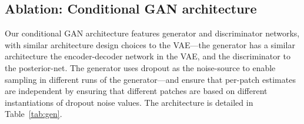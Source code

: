 \documentclass[10pt,twocolumn,letterpaper]{article}
\begin{document}
\subsection{Ablation: Conditional GAN architecture}

Our conditional GAN architecture features generator and discriminator networks, with similar architecture design choices to the VAE---the generator has a similar architecture the encoder-decoder network in the VAE, and the discriminator to the posterior-net. The generator uses dropout as the noise-source to enable sampling in different runs of the generator---and ensure that per-patch estimates are independent by ensuring that different patches are based on different instantiations of dropout noise values. The architecture is detailed in Table~\ref{tab:gen}.
\begin{table}[!t]
  \begin{center}
    \parbox[c]{0.47\textwidth}{}
\end{center}
\end{table}
\end{document}
